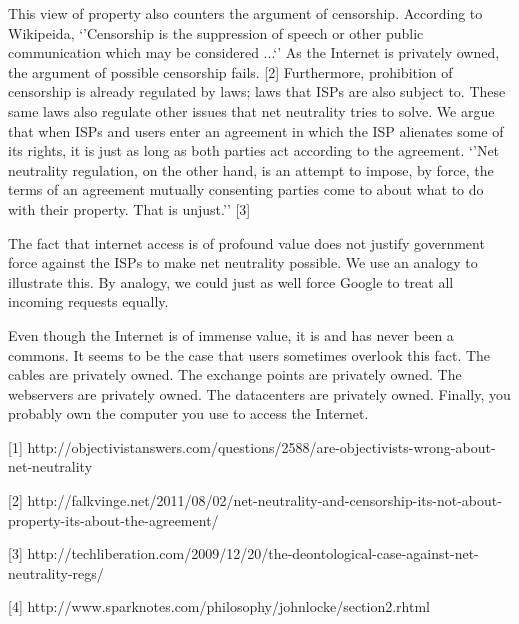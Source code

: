 This view of property also counters the argument of censorship. According to Wikipeida, `'Censorship is the suppression of speech or other public communication which may be considered ...`' As the Internet is privately owned, the argument of possible censorship fails. [2] Furthermore, prohibition of censorship is already regulated by laws; laws that ISPs are also subject to. These same laws also regulate other issues that net neutrality tries to solve. We argue that when ISPs and users enter an agreement in which the ISP alienates some of its rights, it is just as long as both parties act according to the agreement. `'Net neutrality regulation, on the other hand, is an attempt to impose, by force, the terms of an agreement mutually consenting parties come to about what to do with their property. That is unjust.'' [3]

The fact that internet access is of profound value does not justify government force against the ISPs to make net neutrality possible. We use an analogy to illustrate this. By analogy, we could just as well force Google to treat all incoming requests equally. %

Even though the Internet is of immense value, it is and has never been a commons. It seems to be the case that users sometimes overlook this fact. The cables are privately owned. The exchange points are privately owned. The webservers are privately owned. The datacenters are privately owned. Finally, you probably own the computer you use to access the Internet.


[1] http://objectivistanswers.com/questions/2588/are-objectivists-wrong-about-net-neutrality

[2] http://falkvinge.net/2011/08/02/net-neutrality-and-censorship-its-not-about-property-its-about-the-agreement/

[3] http://techliberation.com/2009/12/20/the-deontological-case-against-net-neutrality-regs/

[4] http://www.sparknotes.com/philosophy/johnlocke/section2.rhtml